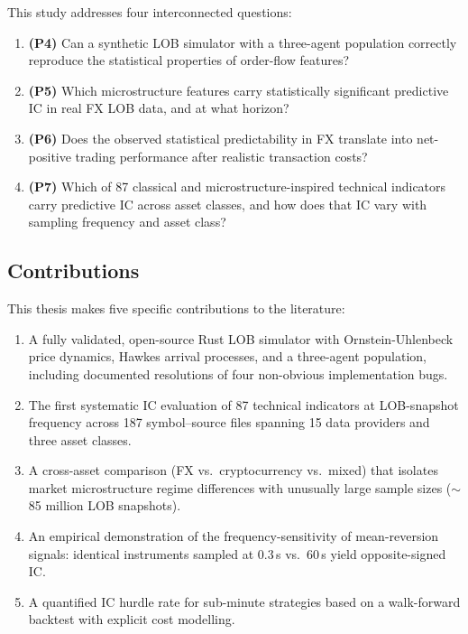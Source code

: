 \documentclass[12pt,a4paper]{article}
\theoremstyle{definition}
\theoremstyle{remark}
\begin{document}
This study addresses four interconnected questions:

\begin{enumerate}
  \item \textbf{(P4)} Can a synthetic LOB simulator with a three-agent
    population correctly reproduce the statistical properties of
    order-flow features?
  \item \textbf{(P5)} Which microstructure features carry statistically
    significant predictive IC in real FX LOB data, and at what horizon?
  \item \textbf{(P6)} Does the observed statistical predictability in FX
    translate into net-positive trading performance after realistic
    transaction costs?
  \item \textbf{(P7)} Which of 87 classical and microstructure-inspired
    technical indicators carry predictive IC across asset classes, and
    how does that IC vary with sampling frequency and asset class?
\end{enumerate}

\subsection{Contributions}

This thesis makes five specific contributions to the literature:

\begin{enumerate}
  \item A fully validated, open-source Rust LOB simulator with
    Ornstein-Uhlenbeck price dynamics, Hawkes arrival processes, and
    a three-agent population, including documented resolutions of
    four non-obvious implementation bugs.
  \item The first systematic IC evaluation of 87 technical indicators
    at LOB-snapshot frequency across 187 symbol--source files spanning
    15 data providers and three asset classes.
  \item A cross-asset comparison (FX vs.\ cryptocurrency vs.\ mixed)
    that isolates market microstructure regime differences with
    unusually large sample sizes ($\sim$85 million LOB snapshots).
  \item An empirical demonstration of the frequency-sensitivity of
    mean-reversion signals: identical instruments sampled at 0.3\,s
    vs.\ 60\,s yield opposite-signed IC.
  \item A quantified IC hurdle rate for sub-minute strategies based on
    a walk-forward backtest with explicit cost modelling.
\end{enumerate}
\end{document}

